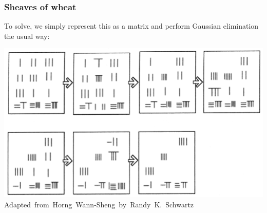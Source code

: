 \documentclass{beamer}
\theoremstyle{definition}
\begin{document}
\begin{frame}
    \frametitle{Sheaves of wheat}

    To solve, we simply represent this as a matrix and perform Gaussian elimination the usual way:
    \pause
    \begin{center}
        \includegraphics{Images/NineChaptersMatrix.png}
        \hspace*{15pt}\hbox{\scriptsize Adapted from Horng Wann-Sheng by Randy K. Schwartz \cite{maa}}
    \end{center}
\end{frame}
\end{document}

